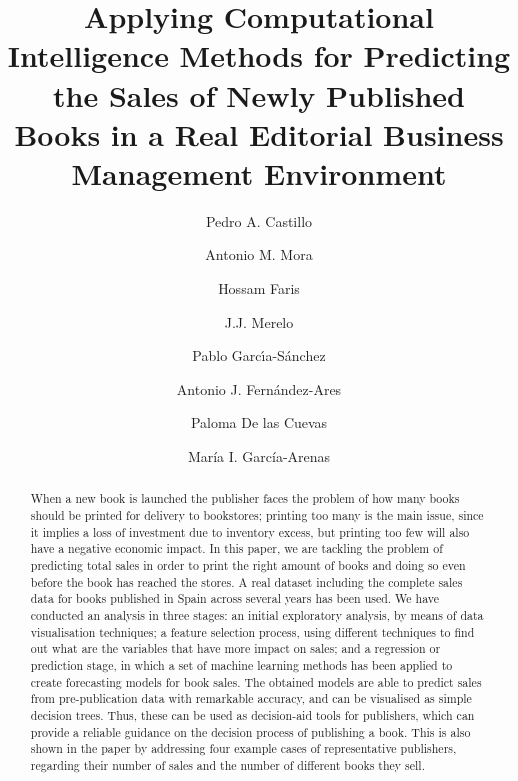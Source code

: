 \documentclass[a4paper,10pt,twocolumn,preprint,3p]{elsarticle}
\begin{document}
\begin{frontmatter}

\title{Applying Computational Intelligence Methods for Predicting the Sales of Newly Published Books in a Real Editorial Business Management Environment} 




\author[ugr]{Pedro A. Castillo}
\author[ugr]{Antonio M. Mora}
\author[abd]{Hossam Faris}
\author[ugr]{J.J. Merelo}
\author[ugr]{Pablo Garc\'{\i}a-S\'anchez}
\author[ugr]{Antonio J. Fern\'andez-Ares}
\author[ugr]{Paloma De las Cuevas}
\author[ugr]{Mar\'ia I. Garc\'ia-Arenas}


\address[ugr]{Department of Computer Architecture and Computer Technology, ETSIIT and CITIC \\
University of Granada, Granada, Spain. Tel: +34958241778. Fax: +34958248993}
\address[abd]{Business Information Technology Department, King Abdullah II School for Information Technology \\
The University of Jordan, Amman, Jordan}

\begin{abstract}
When a new book is launched the publisher faces the problem of how
many books should be printed for delivery to bookstores; printing too 
many is the main issue, since it implies a loss of investment due to
inventory excess, but printing too few will also have a negative economic impact. 
In this paper, we are tackling the problem of predicting total sales 
in order to print the right amount of books and doing so even before the book 
has reached the stores. A real dataset including the complete sales data for 
books published in Spain across several years has been used.
We have conducted an analysis in three stages: an initial exploratory analysis, 
by means of data visualisation techniques; a feature selection process, using 
different techniques to find out what are the variables that have more impact on sales; 
and a regression or prediction stage, in which a set of machine learning methods 
has been applied to create forecasting models for book sales. 
The obtained models are able to predict sales from pre-publication data with
remarkable accuracy, and can be visualised as simple decision trees. 
Thus, these can be used as decision-aid tools for publishers, which can provide 
a reliable guidance on the decision process of publishing a book. 
This is also shown in the paper by addressing four example cases of representative 
publishers, regarding their number of sales and the number of different books they sell.
\end{abstract}


\end{frontmatter}
\end{document}
